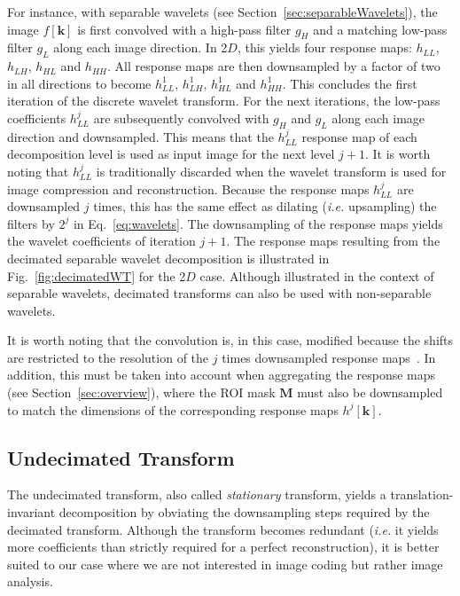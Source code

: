 \documentclass[fleqn,a4paper,oneside,openany]{book}
\begin{document}
For instance, with separable wavelets (see Section~\ref{sec:separableWavelets}), the image $f[\boldsymbol{k}]$ is first convolved with a high-pass filter $g_H$ and a matching low-pass filter $g_L$ along each image direction.
In 2$D$, this yields four response maps: $h_{LL}$, $h_{LH}$, $h_{HL}$ and $h_{HH}$.
All response maps are then downsampled by a factor of two in all directions to become $h_{LL}^1$, $h_{LH}^1$, $h_{HL}^1$ and $h_{HH}^1$.
This concludes the first iteration of the discrete wavelet transform.
%
For the next iterations, the low-pass coefficients $h_{LL}^j$ are subsequently convolved with $g_H$ and $g_L$ along each image direction and downsampled. 
This means that the $h_{LL}^j$ response map of each decomposition level is used as input image for the next level $j+1$.
It is worth noting that $h_{LL}^j$ is traditionally discarded when the wavelet transform is used for image compression and reconstruction.
Because the response maps $h_{LL}^j$ are downsampled $j$ times, this has the same effect as dilating (\textit{i.e.} upsampling) the filters by $2^j$ in Eq.~\eqref{eq:wavelets}.
The downsampling of the response maps yields the wavelet coefficients of iteration $j+1$.
The response maps resulting from the decimated separable wavelet decomposition is illustrated in Fig.~\ref{fig:decimatedWT} for the 2$D$ case.
Although illustrated in the context of separable wavelets, decimated transforms can also be used with non-separable wavelets.

It is worth noting that the convolution is, in this case, modified because the shifts are restricted to the resolution of the $j$ times downsampled response maps~\cite{Dau1992}. In addition, this must be taken into account when aggregating the response maps (see Section~\ref{sec:overview}), where the ROI mask $\boldsymbol{M}$ must also be downsampled to match the dimensions of the corresponding response maps $h^j[\boldsymbol{k}]$.

\subsection{Undecimated Transform}\label{sec:undecimatedWT}
%
The undecimated transform, also called \emph{stationary} transform, yields a translation-invariant decomposition by obviating the downsampling steps required by the decimated transform. Although the transform becomes redundant (\textit{i.e.} it yields more coefficients than strictly required for a perfect reconstruction), it is better suited to our case where we are not interested in image coding but rather image analysis.
\end{document}
